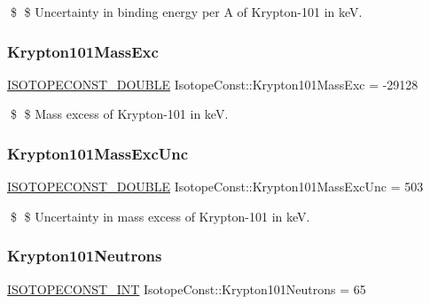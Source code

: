 \$ \$ Uncertainty in binding energy per A of Krypton-\/101 in keV. \mbox{\label{group___isotope_const-_krypton-_kr101_gabc951bfe36e579e3384d4cb421766303}} 
\subsubsection{\texorpdfstring{Krypton101\+Mass\+Exc}{Krypton101MassExc}}
{\footnotesize\ttfamily \mbox{\hyperlink{group___isotope_const-_macros_ga8f45a7272ce02c0b4c65c44636ed719a}{I\+S\+O\+T\+O\+P\+E\+C\+O\+N\+S\+T\+\_\+\+D\+O\+U\+B\+LE}} Isotope\+Const\+::\+Krypton101\+Mass\+Exc = -\/29128}

\$ \$ Mass excess of Krypton-\/101 in keV. \mbox{\label{group___isotope_const-_krypton-_kr101_ga89847881b754505f3a5faeaee64b793b}} 
\subsubsection{\texorpdfstring{Krypton101\+Mass\+Exc\+Unc}{Krypton101MassExcUnc}}
{\footnotesize\ttfamily \mbox{\hyperlink{group___isotope_const-_macros_ga8f45a7272ce02c0b4c65c44636ed719a}{I\+S\+O\+T\+O\+P\+E\+C\+O\+N\+S\+T\+\_\+\+D\+O\+U\+B\+LE}} Isotope\+Const\+::\+Krypton101\+Mass\+Exc\+Unc = 503}

\$ \$ Uncertainty in mass excess of Krypton-\/101 in keV. \mbox{\label{group___isotope_const-_krypton-_kr101_ga021c9f1fe32fe6b3465f1ce77b1ec383}} 
\subsubsection{\texorpdfstring{Krypton101\+Neutrons}{Krypton101Neutrons}}
{\footnotesize\ttfamily \mbox{\hyperlink{group___isotope_const-_macros_ga5f18360b3e99483a35c32d789e62621c}{I\+S\+O\+T\+O\+P\+E\+C\+O\+N\+S\+T\+\_\+\+I\+NT}} Isotope\+Const\+::\+Krypton101\+Neutrons = 65}

